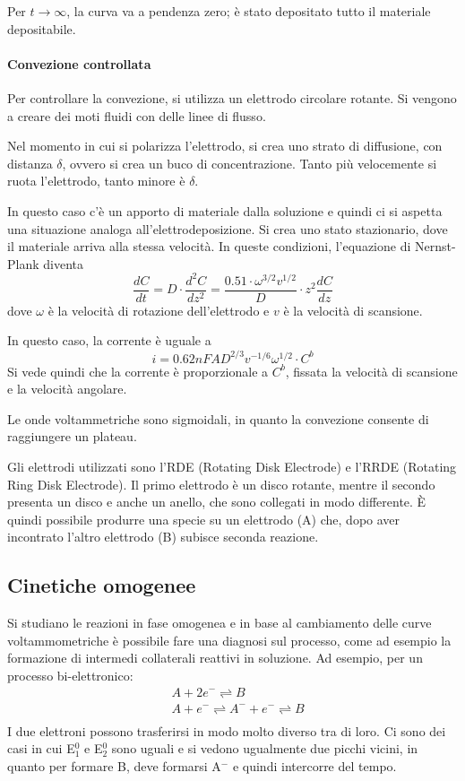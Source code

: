 Per $t \to \infty$, la curva va a pendenza zero; è stato depositato tutto il materiale depositabile.

\paragraph{Convezione controllata}
Per controllare la convezione, si utilizza un elettrodo circolare rotante.
Si vengono a creare dei moti fluidi con delle linee di flusso.

Nel momento in cui si polarizza l'elettrodo, si crea uno strato di diffusione, con distanza $\delta$, ovvero si crea un buco di concentrazione.
Tanto più velocemente si ruota l'elettrodo, tanto minore è $\delta$.

In questo caso c'è un apporto di materiale dalla soluzione e quindi ci si aspetta una situazione analoga all'elettrodeposizione.
Si crea uno stato stazionario, dove il materiale arriva alla stessa velocità.
In queste condizioni, l'equazione di Nernst-Plank diventa
\[
\frac{dC}{dt} = D \cdot \frac{d^2 C}{dz^2} = \frac{0.51 \cdot \omega^{3/2} v^{1/2}}{D} \cdot z^2 \frac{dC}{dz}
\]
dove $\omega$ è la velocità di rotazione dell'elettrodo e $v$ è la velocità di scansione.

In questo caso, la corrente è uguale a
\[
i = 0.62 n F A D^{2/3} v^{-1/6} \omega^{1/2} \cdot C^b
\]
Si vede quindi che la corrente è proporzionale a $C^b$, fissata la velocità di scansione e la velocità angolare.

Le onde voltammetriche sono sigmoidali, in quanto la convezione consente di raggiungere un plateau.


Gli elettrodi utilizzati sono l'RDE (Rotating Disk Electrode) e l'RRDE (Rotating Ring Disk Electrode).
Il primo elettrodo è un disco rotante, mentre il secondo presenta un disco e anche un anello, che sono collegati in modo differente.
È quindi possibile produrre una specie su un elettrodo (A) che, dopo aver incontrato l'altro elettrodo (B) subisce seconda reazione.

\subsection{Cinetiche omogenee}
Si studiano le reazioni in fase omogenea e in base al cambiamento delle curve voltammometriche è possibile fare una diagnosi sul processo, come ad esempio la formazione di intermedi collaterali reattivi in soluzione.
Ad esempio, per un processo bi-elettronico:
\begin{align*}
& A + 2e^- \rightleftharpoons B\\
& A + e^- \rightleftharpoons A^- + e^- \rightleftharpoons B\\
\end{align*}
I due elettroni possono trasferirsi in modo molto diverso tra di loro.
Ci sono dei casi in cui E$^0_1$ e E$^0_2$ sono uguali e si vedono ugualmente due picchi vicini, in quanto per formare B, deve formarsi A$^-$ e quindi intercorre del tempo.

